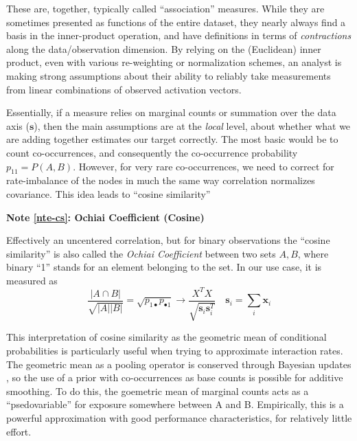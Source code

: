 \documentclass[%
	12pt,
		oneside,
		letterpaper
]{book}
\newcounter{quartocalloutnteno}
\newcommand{\quartocalloutnte}[1]{\refstepcounter{quartocalloutnteno}\label{#1}}
\begin{document}
These are, together, typically called ``association'' measures. While
they are sometimes presented as functions of the entire dataset, they
nearly always find a basis in the inner-product operation, and have
definitions in terms of \emph{contractions} along the data/observation
dimension. By relying on the (Euclidean) inner product, even with
various re-weighting or normalization schemes, an analyst is making
strong assumptions about their ability to reliably take measurements
from linear combinations of observed activation vectors.

Essentially, if a measure relies on marginal counts or summation over
the data axis (\(\mathbf{s}\)), then the main assumptions are at the
\emph{local} level, about whether what we are adding together estimates
our target correctly. The most basic would be to count co-occurrences,
and consequently the co-occurrence probability \(p_{11}=P(A,B)\).
However, for very rare co-occurrences, we need to correct for
rate-imbalance of the nodes in much the same way correlation normalizes
covariance. This idea leads to ``cosine similarity''

\begin{tcolorbox}[enhanced jigsaw, opacityback=0, arc=.35mm, colback=white, colframe=quarto-callout-note-color-frame, toprule=.15mm, breakable, leftrule=.75mm, rightrule=.15mm, bottomrule=.15mm, left=2mm]

\quartocalloutnte{nte-cs} 

\vspace{-3mm}\textbf{Note \ref*{nte-cs}: Ochiai Coefficient (Cosine)}\vspace{3mm}

Effectively an uncentered correlation, but for binary observations the
``cosine similarity'' is also called the \emph{Ochiai Coefficient}
between two sets \(A,B\), where binary ``1'' stands for an element
belonging to the set.\autocite{Measuresecologicalassociation_Janson1981}
In our use case, it is measured as \[
\frac{|A \cap B |}{\sqrt{|A||B|}}=\sqrt{p_{1\bullet}p_{\bullet 1}} \rightarrow  \frac{X^TX}{\sqrt{\mathbf{s}_i\mathbf{s}_i^T}}\quad \mathbf{s}_i = \sum_i \mathbf{x}_i
\]

\end{tcolorbox}

This interpretation of cosine similarity as the geometric mean of
conditional probabilities is particularly useful when trying to
approximate interaction rates. The geometric mean as a pooling operator
is conserved through Bayesian updates
\autocite{ProbabilityAggregationMethods_Allard2012}, so the use of a
prior with co-occurrences as base counts is possible for additive
smoothing. To do this, the goemetric mean of marginal counts acts as a
``psedovariable'' for exposure somewhere between A and B. Empirically,
this is a powerful approximation with good performance characteristics,
for relatively little effort.
\end{document}
